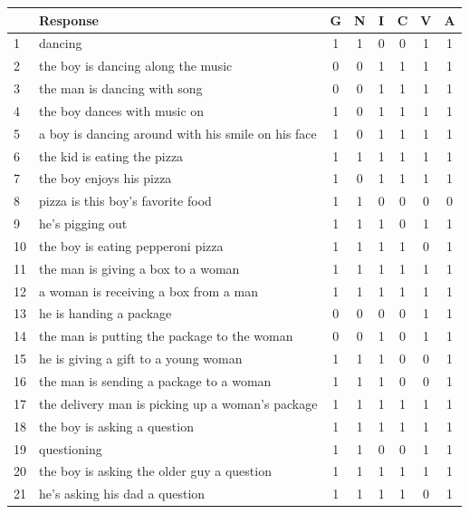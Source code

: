 \documentclass[12pt,notitlepage]{article}
\begin{document}
\begin{table}[h]
\begin{center}
\begin{tabular}{|l|p{11cm}|c|c|c|c|c|c|}
\hline
& Response & G & N & I & C & V & A \\
\hline
\hline
1 & dancing & 1 & 1 & 0 & 0 & 1 & 1 \\
\hline
2 & the boy is dancing along the music & 0 & 0 & 1 & 1 & 1 & 1 \\
\hline
3 & the man is dancing with song & 0 & 0 & 1 & 1 & 1 & 1 \\
\hline
4 & the boy dances with music on & 1 & 0 & 1 & 1 & 1 & 1 \\
\hline
5 & a boy is dancing around with his smile on his face & 1 & 0 & 1 & 1 & 1 & 1 \\
\hline
\hline
6 & the kid is eating the pizza & 1 & 1 & 1 & 1 & 1 & 1 \\
\hline
7 & the boy enjoys his pizza & 1 & 0 & 1 & 1 & 1 & 1 \\
\hline
8 & pizza is this boy's favorite food & 1 & 1 & 0 & 0 & 0 & 0 \\
\hline
9 & he's pigging out & 1 & 1 & 1 & 0 & 1 & 1 \\
\hline
10 & the boy is eating pepperoni pizza & 1 & 1 & 1 & 1 & 0 & 1 \\
\hline
\hline
11 & the man is giving a box to a woman & 1 & 1 & 1 & 1 & 1 & 1 \\
\hline
12 & a woman is receiving a box from a man & 1 & 1 & 1 & 1 & 1 & 1 \\
\hline
13 & he is handing a package & 0 & 0 & 0 & 0 & 1 & 1 \\
\hline
14 & the man is putting the package to the woman & 0 & 0 & 1 & 0 & 1 & 1 \\
\hline
15 & he is giving a gift to a young woman & 1 & 1 & 1 & 0 & 0 & 1 \\
\hline
16 & the man is sending a package to a woman & 1 & 1 & 1 & 0 & 0 & 1 \\
\hline
17 & the delivery man is picking up a woman's package & 1 & 1 & 1 & 1 & 1 & 1 \\
\hline
\hline
18 & the boy is asking a question & 1 & 1 & 1 & 1 & 1 & 1 \\
\hline
19 & questioning & 1 & 1 & 0 & 0 & 1 & 1 \\
\hline
20 & the boy is asking the older guy a question & 1 & 1 & 1 & 1 & 1 & 1 \\
\hline
21 & he's asking his dad a question & 1 & 1 & 1 & 1 & 0 & 1 \\

\end{tabular}
\end{center}
\end{table}
\end{document}
